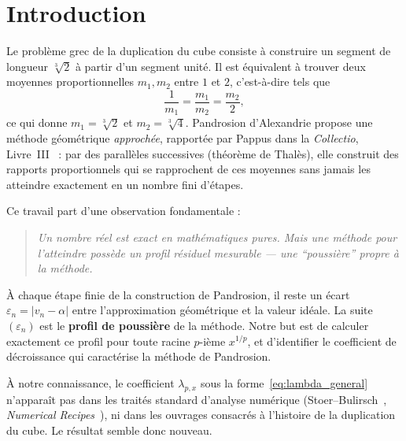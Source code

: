 \documentclass[11pt,a4paper]{article}
\theoremstyle{definition}
\newcommand{\cbrt}[1]{\sqrt[3]{#1}}
\newcommand{\eps}{\varepsilon}
\begin{document}
\tableofcontents
\bigskip

\section{Introduction}

Le problème grec de la duplication du cube consiste à construire un segment de longueur $\cbrt{2}$ à partir d'un segment unité. Il est équivalent à trouver deux moyennes proportionnelles $m_1, m_2$ entre $1$ et $2$, c'est-à-dire tels que
\[
  \frac{1}{m_1} = \frac{m_1}{m_2} = \frac{m_2}{2},
\]
ce qui donne $m_1 = \cbrt{2}$ et $m_2 = \cbrt{4}$. Pandrosion d'Alexandrie propose une méthode géométrique \emph{approchée}, rapportée par Pappus dans la \textit{Collectio}, Livre~III~\cite{pappus} : par des parallèles successives (théorème de Thalès), elle construit des rapports proportionnels qui se rapprochent de ces moyennes sans jamais les atteindre exactement en un nombre fini d'étapes.

\medskip

Ce travail part d'une observation fondamentale :

\begin{quote}
\itshape Un nombre réel est exact en mathématiques pures. Mais une méthode pour l'atteindre possède un profil résiduel mesurable --- une ``poussière'' propre à la méthode.
\end{quote}

À chaque étape finie de la construction de Pandrosion, il reste un écart $\eps_n = |v_n - \alpha|$ entre l'approximation géométrique et la valeur idéale. La suite $(\eps_n)$ est le \textbf{profil de poussière} de la méthode. Notre but est de calculer exactement ce profil pour toute racine $p$-ième $x^{1/p}$, et d'identifier le coefficient de décroissance qui caractérise la méthode de Pandrosion.

\medskip

À notre connaissance, le coefficient $\lambda_{p,x}$ sous la forme~\eqref{eq:lambda_general} n'apparaît pas dans les traités standard d'analyse numérique (Stoer--Bulirsch~\cite{stoer}, \textit{Numerical Recipes}~\cite{numrecipes}), ni dans les ouvrages consacrés à l'histoire de la duplication du cube. Le résultat semble donc nouveau.

\medskip
\end{document}
